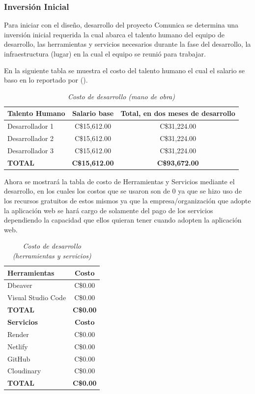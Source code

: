 \subsubsection{Inversión Inicial}
Para iniciar con el diseño, desarrollo del proyecto Comunica se determina una inversión inicial requerida la cual abarca el talento humano del equipo de desarrollo, las herramientas y servicios necesarios durante la fase del desarrollo, la infraestructura (lugar) en la cual el equipo se reunió para trabajar. 

En la siguiente tabla se muestra el costo del talento humano el cual el salario se baso en lo reportado por (\cite{wageindicator2026nicaragua}).

\begin{table}[htbp]
	\centering
	\caption{\emph{Costo de desarrollo (mano de obra)}}
	\label{tab:costo_mano_obra}
	\begin{tabularx}{\textwidth}{X c c}
		\toprule
		\textbf{Talento Humano} & \textbf{Salario base} & \textbf{Total, en dos meses de desarrollo} \\
		\midrule
		Desarrollador 1 & C\$15,612.00 & C\$31,224.00 \\
		Desarrollador 2 & C\$15,612.00 & C\$31,224.00 \\
		Desarrollador 3 & C\$15,612.00 & C\$31,224.00 \\
		\midrule
		\textbf{TOTAL} & \textbf{C\$15,612.00} & \textbf{C\$93,672.00} \\
		\bottomrule
	\end{tabularx}
\end{table}

Ahora se mostrará la tabla de costo de Herramientas y Servicios mediante el desarrollo, en los cuales los costos que se usaron son de 0 ya que se hizo uso de los recursos gratuitos de estos mismos ya que la empresa/organización que adopte la aplicación web se hará cargo de solamente del pago de los servicios dependiendo la capacidad que ellos quieran tener cuando adopten la aplicación web.

\begin{table}[htbp]
	\centering
	\caption{\emph{Costo de desarrollo (herramientas y servicios)}}
	\label{tab:costo_herramientas}
	\begin{tabularx}{\textwidth}{X c}
		\toprule
		\textbf{Herramientas} & \textbf{Costo} \\
		\midrule
		Dbeaver & C\$0.00 \\
		Visual Studio Code & C\$0.00 \\
		\midrule
		\textbf{TOTAL} & \textbf{C\$0.00} \\
		\bottomrule
		\toprule
		\textbf{Servicios} & \textbf{Costo} \\
		\midrule
		Render & C\$0.00 \\
		Netlify & C\$0.00 \\
		GitHub & C\$0.00 \\
		Cloudinary & C\$0.00 \\
		\midrule
		\textbf{TOTAL} & \textbf{C\$0.00} \\
		\bottomrule
	\end{tabularx}
\end{table}

